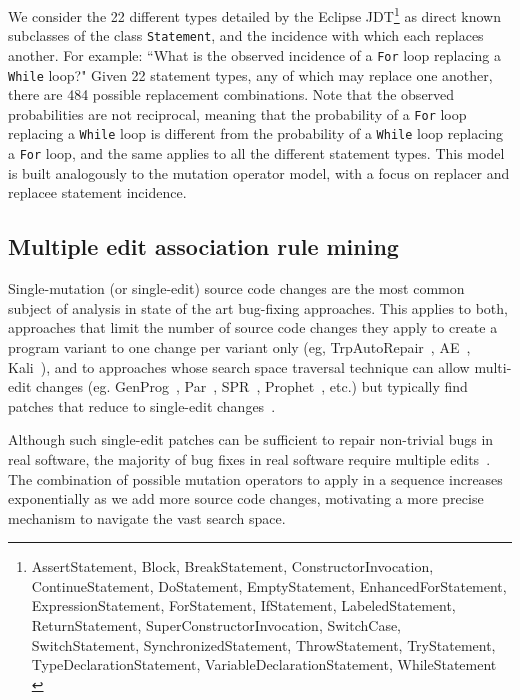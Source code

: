 \documentclass[conference]{IEEEtran}
\begin{document}
We consider 
the 22 different types detailed by the Eclipse
JDT\footnote{AssertStatement, Block, BreakStatement, ConstructorInvocation, ContinueStatement, DoStatement, EmptyStatement, EnhancedForStatement, ExpressionStatement, ForStatement, IfStatement, LabeledStatement, ReturnStatement, SuperConstructorInvocation, SwitchCase, SwitchStatement, SynchronizedStatement, ThrowStatement, TryStatement, TypeDeclarationStatement, VariableDeclarationStatement, WhileStatement \label{stmtNames}} as
direct known subclasses of the class \texttt{Statement}, and the incidence with which
each 
replaces another. For example: ``What is the observed incidence of a \texttt{For} loop 
replacing a \texttt{While} loop?" Given 22 statement types, any of which may replace one
another, there are 484 possible replacement combinations. 
Note that the observed probabilities are not reciprocal, meaning 
that the probability of a \texttt{For} loop replacing a \texttt{While} loop is different from the 
probability of a \texttt{While} loop replacing a \texttt{For} loop, and the same applies to all 
the different statement types.
This model is built analogously to the
mutation operator model, with a focus on replacer and replacee statement incidence.

\subsection{Multiple edit association rule mining} 
\label{multEdit}

Single-mutation (or single-edit) source code changes are the most 
common subject of analysis in 
state of the art bug-fixing
approaches. This applies to both, approaches that limit the number of source 
code changes they apply to create a program variant to one change per variant 
only (eg, TrpAutoRepair~\cite{Qi13TrpAutoR}, AE~\cite{Weimer13}, Kali~\cite{Qi15}), and 
to approaches whose search space traversal technique can allow multi-edit 
changes (eg. GenProg~\cite{legoues12}, Par~\cite{kim2013}, SPR~\cite{fan15SPR},
Prophet~\cite{long16proph}, etc.) but typically find patches that reduce to
single-edit changes~\cite{arcuri11}.

Although such single-edit patches can be
sufficient to repair non-trivial bugs in real software, the majority of bug fixes in real
software require multiple edits~\cite{zhong15,Soto15}. The combination of possible mutation
 operators to apply in a sequence increases exponentially as we add more source
 code changes, motivating a more precise mechanism to navigate the vast search
 space. 
\end{document}
